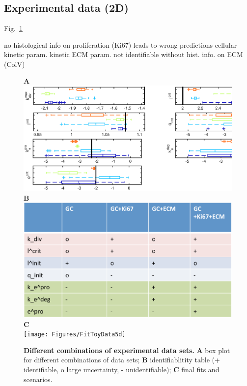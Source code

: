 \documentclass[10pt,letterpaper]{article}
\begin{document}
\subsection*{Experimental data (2D)}
Fig.~\ref{fig5} 

no histological info on proliferation (Ki67) leads to wrong predictions cellular kinetic param.
kinetic ECM param. not identifiable without hist. info. on ECM (ColV)


\begin{figure}[htbp]
\textbf{A}\\
\includegraphics[width=\textwidth]{Figures/FitToyData5c}\\
\textbf{B}\\
\includegraphics[width=\textwidth]{Figures/FitExpDataIdentifiabilityTable}\\
\textbf{C}\\
\texttt{[image: Figures/FitToyData5d]}
\caption{{\bf Different combinations of experimental data sets.}
\textbf{A} box plot for different combinations of data sets; \textbf{B} identifiablitity table (+ identifiable, o large uncertainty, - unidentifiable); \textbf{C} final fits and scenarios.}
\label{fig5}
\end{figure}
\end{document}

